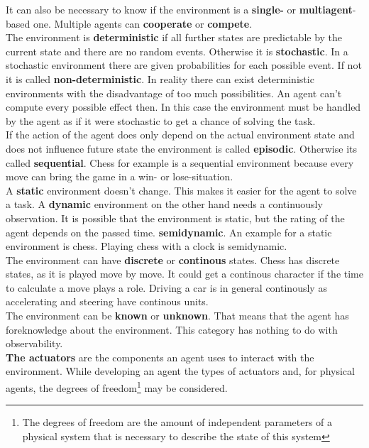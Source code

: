 \documentclass[10pt,a4paper,DIV=11]{scrreprt}
\begin{document}
It can also be necessary to know if the environment is a \textbf{single-} or \textbf{multiagent}-based one. Multiple agents can \textbf{cooperate} or \textbf{compete}. \\

The environment is \textbf{deterministic} if all further states are predictable by the current state and there are no random events. Otherwise it is \textbf{stochastic}.
In a stochastic environment there are given probabilities for each possible event. If not it is called \textbf{non-deterministic}.
In reality there can exist deterministic environments with the disadvantage of too much possibilities. An agent can't  compute every possible effect then.
In this case the environment must be handled by the agent as if it were stochastic to get a chance of solving the task. \\

If the action of the agent does only depend on the actual environment state and does not influence future state the environment is called \textbf{episodic}. Otherwise its called
\textbf{sequential}. Chess for example is a sequential environment because every move can bring the game in a win- or lose-situation. \\

A \textbf{static} environment doesn't change. This makes it easier for the agent to solve a task. A \textbf{dynamic} environment on the other hand needs a continuously observation.
It is possible that the environment is static, but the rating of the agent depends on the passed time. \textbf{semidynamic}. An example for a static environment is chess. Playing chess with a clock is semidynamic. \\

The environment can have \textbf{discrete} or \textbf{continous} states. Chess has discrete states, as it is played move by move. It could get a continous character if the time to calculate a move plays a role. Driving a car is in general continously as accelerating and steering have continous units.\\

The environment can be \textbf{known} or \textbf{unknown}. That means that the agent has foreknowledge about the environment. This category has nothing to do with observability. \\


\textbf{The actuators} are the components an agent uses to interact with the environment. While developing an agent the types of actuators and, for physical agents, the degrees of freedom\footnote{The degrees of freedom are the amount of independent parameters of a physical system that is necessary to describe the state of this system} may be considered.\\
\end{document}
